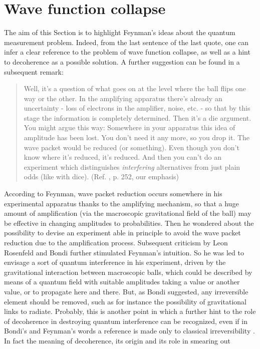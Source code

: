 \documentclass{ws-procs961x669}            %
\begin{document}
\section{Wave function collapse}

The aim of this Section is to highlight Feynman's ideas about the
quantum measurement problem. Indeed, from the last sentence of the
last quote, one can infer a clear reference to the problem of wave
function collapse, as well as a hint to decoherence as a possible
solution. A further suggestion can be found in a subsequent
remark:
%
\begin{quote}
Well, it's a question of what goes on at the level where the ball
flips one way or the other. In the amplifying apparatus there's
already an uncertainty - loss of electrons in the amplifier,
noise, etc. - so that by this stage the information is completely
determined. Then it's a die argument. You might argue this way:
Somewhere in your apparatus this idea of amplitude has been lost.
You don't need it any more, so you drop it. The wave packet would
be reduced (or something). Even though you don't know where it's
reduced, it's reduced. And then you can't do an experiment which
distinguishes  \emph{interfering} alternatives from just plain
odds (like with dice). (Ref. , p. 252, our
emphasis)
\end{quote}
%
According to Feynman, wave packet reduction occurs somewhere in
his experimental apparatus thanks to the amplifying mechanism, so
that a huge amount of amplification (via the macroscopic
gravitational field of the ball) may be effective in changing
amplitudes to probabilities. Then he wondered about the
possibility to devise an experiment able in principle to avoid the
wave packet reduction due to the amplification process. Subsequent
criticism by Leon Rosenfeld and Bondi further stimulated Feynman's
intuition. So he was led to envisage a sort of quantum
interference in his experiment, driven by the gravitational
interaction between macroscopic balls, which could be described by
means of a quantum field with suitable amplitudes taking a value
or another value, or to propagate here and there. But, as Bondi
suggested, any irreversible element should be removed, such as for
instance the possibility of gravitational links to radiate.
Probably, this is another point in which a further hint to the
role of decoherence in destroying quantum interference can be
recognized, even if in Bondi's and Feynman's words a reference is
made only to classical irreversibility \cite{Zeh}. In fact the
meaning of decoherence, its origin and its role in smearing out
\end{document}
